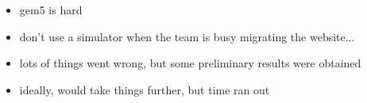 \begin{itemize}
    \item gem5 is hard
    \item don't use a simulator when the team is busy migrating the website...
    \item lots of things went wrong, but some preliminary results were obtained
    \item ideally, would take things further, but time ran out
\end{itemize}
